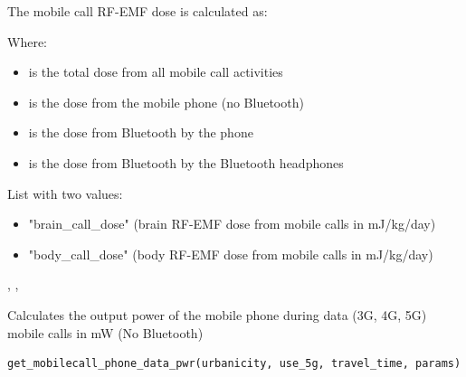 \documentclass[a4paper]{book}
\begin{document}
%
\begin{Details}
The mobile call RF-EMF dose is calculated as:

Where:
\begin{itemize}

\item{}  is the total dose from all mobile call activities
\item{}  is the dose from the mobile phone (no Bluetooth)
\item{}  is the dose from Bluetooth by the phone
\item{}  is the dose from Bluetooth by the Bluetooth headphones

\end{itemize}

\end{Details}
%
\begin{Value}
List with two values:
\begin{itemize}

\item{} "brain\_call\_dose" (brain RF-EMF dose from mobile calls in mJ/kg/day)
\item{} "body\_call\_dose" (body RF-EMF dose from mobile calls in mJ/kg/day)

\end{itemize}

\end{Value}
%
\begin{SeeAlso}
, , 
\end{SeeAlso}
%
\begin{Description}
Calculates the output power of the mobile phone during data (3G, 4G, 5G) mobile calls in mW (No Bluetooth)
\end{Description}
%
\begin{Usage}
\begin{verbatim}
get_mobilecall_phone_data_pwr(urbanicity, use_5g, travel_time, params)
\end{verbatim}
\end{Usage}
\end{document}
